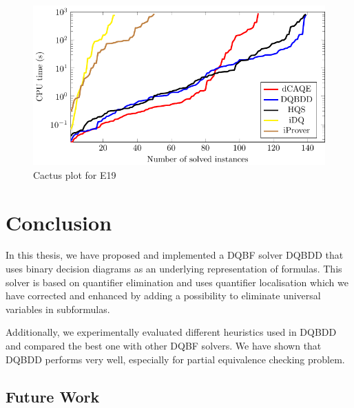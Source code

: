 \documentclass[
  digital, %
  color,
  twoside, %
  table,   %
  nolof,     %
  nolot,     %
]{fithesis3}
\theoremstyle{definition}
\theoremstyle{remark}
\begin{document}
\begin{figure}
  \centering
    \centering
    \includegraphics[width=\textwidth]{figures/E19logcactusplot.pdf}
  \caption{Cactus plot for E19}
  \label{fig:cactusE19}
\end{figure}

\chapter{Conclusion}
In this thesis, we have proposed and implemented a DQBF solver DQBDD that uses binary decision diagrams as an underlying representation of formulas. This solver is based on quantifier elimination and uses quantifier localisation which we have corrected and enhanced by adding a possibility to eliminate universal variables in subformulas.

Additionally, we experimentally evaluated different heuristics used in DQBDD and compared the best one with other DQBF solvers. We have shown that DQBDD performs very well, especially for partial equivalence checking problem.

\section{Future Work}
\end{document}
